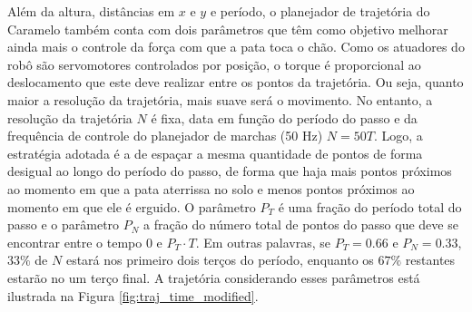 \documentclass[../main.tex]{subfiles}
\begin{document}
Além da altura, distâncias em $x$ e $y$ e período, o planejador de trajetória do Caramelo também conta com dois parâmetros que têm como objetivo melhorar ainda mais o controle da força com que a pata toca o chão. Como os atuadores do robô são servomotores controlados por posição, o torque é proporcional ao deslocamento que este deve realizar entre os pontos da trajetória. Ou seja, quanto maior a resolução da trajetória, mais suave será o movimento. No entanto, a resolução da trajetória $N$ é fixa, data em função do período do passo e da frequência de controle do planejador de marchas (50 Hz) $N = 50T$. Logo, a estratégia adotada é a de espaçar a mesma quantidade de pontos de forma desigual ao longo do período do passo, de forma que haja mais pontos próximos ao momento em que a pata aterrissa no solo e menos pontos próximos ao momento em que ele é erguido. O parâmetro $P_T$ é uma fração do período total do passo e o parâmetro $P_N$ a fração do número total de pontos do passo que deve se encontrar entre o tempo $0$ e $P_T \cdot T$. Em outras palavras, se $P_T = 0.66$ e $P_N = 0.33$, $33\%$ de $N$ estará nos primeiro dois terços do período, enquanto os $67\%$ restantes estarão no um terço final. A trajetória considerando esses parâmetros está ilustrada na Figura \ref{fig:traj_time_modified}.
\end{document}
